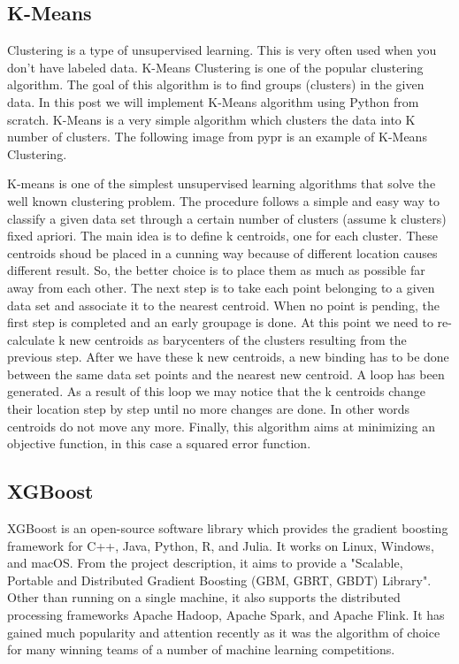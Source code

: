 \documentclass[12pt,report]{ucdavisthesis}
\begin{document}
         \subsection{ K-Means}
         \hspace{2cm}Clustering is a type of unsupervised learning. This is very often used when you
        don’t have labeled data. K-Means Clustering is one of the popular clustering
        algorithm. The goal of this algorithm is to find groups (clusters) in the given data.
        In this post we will implement K-Means algorithm using Python from scratch.
        \hspace{2cm}K-Means is a very simple algorithm which clusters the data into K number of
        clusters. The following image from pypr is an example of K-Means Clustering.
        \par\hspace{2cm}K-means is one of the simplest unsupervised learning algorithms that solve the well known clustering problem. The procedure follows a simple and easy way to classify a given data set through a certain number of clusters (assume k clusters) fixed apriori. The main idea is to define k centroids, one for each cluster. These centroids shoud be placed in a cunning way because of different location causes different result. So, the better choice is to place them as much as possible far away from each other. The next step is to take each point belonging to a given data set and associate it to the nearest centroid. When no point is pending, the first step is completed and an early groupage is done. At this point we need to re-calculate k new centroids as barycenters of the clusters resulting from the previous step. After we have these k new centroids, a new binding has to be done between the same data set points and the nearest new centroid. A loop has been generated. As a result of this loop we may notice that the k centroids change their location step by step until no more changes are done. In other words centroids do not move any more.
        Finally, this algorithm aims at minimizing an objective function, in this case a squared error function. 
        
       
        
        \newpage
         \subsection{ XGBoost}
         \hspace{2cm}XGBoost is an open-source software library which provides the gradient boosting framework for C++, Java, Python, R, and Julia. It works on Linux, Windows, and macOS. From the project description, it aims to provide a "Scalable, Portable and Distributed Gradient Boosting (GBM, GBRT, GBDT) Library". Other than running on a single machine, it also supports the distributed processing frameworks Apache Hadoop, Apache Spark, and Apache Flink. It has gained much popularity and attention recently as it was the algorithm of choice for many winning teams of a number of machine learning competitions.
         
\end{document}
